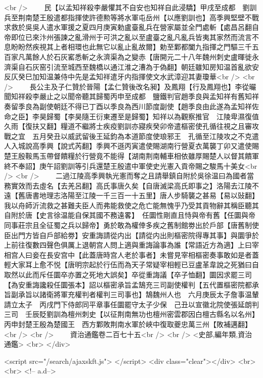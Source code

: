 <br />
　　民【以孟知祥殺李嚴懼其不自安也知祥自此浸驕】甲戌至成都　劉訓兵至荆南楚王殷遣都指揮使許德勲等將水軍屯岳州【以應劉訓也】高季興堅壁不戰求救於吳吳人遣水軍援之夏四月庚寅勅盧臺亂兵在營家屬並全門處斬【處昌呂翻自帝即位已來汴州張諫之亂滑州于可洪之亂以至盧臺之亂凡亂兵皆夷其家然而流言不息盼盼然疾視其上者相環也此無它以亂止亂故爾】勅至鄴都闔九指揮之門驅三千五百家凡萬餘人於石灰窰悉斬之永濟渠為之變赤【唐開元二十八年魏州刺史盧暉徙永濟渠自石灰窑引流至城西至魏橋以通江淮之漕為于偽翻】朝廷雖知房知温首亂欲安反仄癸巳加知温兼侍中先是孟知祥遣牙内指揮使文水武漳迎其妻瓊華<br />
<br />
　　長公主及子仁贊於晉陽【孟仁贊後改名昶】及鳳翔【行及鳳翔也】李從曮聞知祥殺李嚴止之以聞帝聽其歸蜀丙申至成都　鹽鐵判官趙季良與孟知祥有舊知祥奏留季良為副使朝廷不得已丁酉以季良為西川節度副使【趙季良由此遂為孟知祥佐命之臣】李昊歸蜀【李昊隨王衍東遷至是歸蜀】知祥以為觀察推官　江陵卑濕復值久雨【復扶又翻】糧道不繼將士疾疫劉訓亦寢疾癸卯帝遣樞密使孔循往視之且審攻戰之宜　五月癸丑以威武留後王延鈞為本道節度使琅邪王　孔循至江陵攻之不克遣人入城說高季興【說式芮翻】季興不遜丙寅遣使賜湖南行營夏衣萬襲丁卯又遣使賜楚王殷鞍馬玉帶督饋糧於行營竟不能得【湖南荆南輔車相依雖厚賜楚人以督其饋軍終不奉詔】庚午詔劉訓等引兵還楚王殷遣中軍使史光憲入貢帝賜之駿馬十美女<br />
<br />
　　二過江陵高季興執光憲而奪之且請舉鎮自附於吳徐温曰為國者當務實效而去虛名【去羌呂翻】高氏事唐久矣【自唐滅梁高氏即事之】洛陽去江陵不遠【舊唐書地理志洛陽至江陵一千三百一十五里】唐人步騎襲之甚易【易以䜴翻】我以舟師沂流救之甚難夫臣人而弗能救使之危亡能無愧乎乃受其貢物辭其稱臣聽其自附於唐【史言徐温能自保其國不務遠畧】　任圜性剛直且恃與帝有舊【任圜與帝同事莊宗且全征蜀之兵以歸帝】勇於敢為權倖多疾之舊制館劵出於戶部【唐舊制使臣出門方皆自戶部給劵】安重誨請從内出【請從内出則樞密院得專其事】與圜爭於上前往復數四聲色俱厲上退朝宫人問上適與重誨論事為誰【常語近方為適】上曰宰相宫人曰妾在長安宫中【此蓋唐時宫人老於事者】未嘗見宰相樞密奏事敢如是者蓋輕大家耳上愈不悦【唐明宗起於行伍而為天子常疑宰相輕已豆盧革韋說之死猶曰自取然以此而斥任圜卒亦置之死地大誤矣】卒從重誨議【卒子恤翻】圜因求罷三司【為安重誨讒殺任圜張本】詔以樞密承旨孟鵠充三司副使權判【五代置樞密院都承旨副承旨以諸衛將軍充權判者權判三司事也】鵠魏州人也　六月庚辰太子詹事温輦請立太子　丙戌門下侍郎同平章事任圜罷守太子少保　己丑以宣徽北院使張延朗判三司　壬辰貶劉訓為檀州刺史【以征荆南無功也檀州密雲郡因白檀古縣名以名州】　丙申封楚王殷為楚國王　西方鄴敗荆南水軍於峽中復取夔忠萬三州【敗補邁翻】<br />
<br />
　　資治通鑑卷二百七十五<br />
<br />
<史部,編年類,資治通鑑>  <br>
   </div> 

<script src="/search/ajaxskft.js"> </script>
 <div class="clear"></div>
<br>
<br>
 <!-- a.d-->

